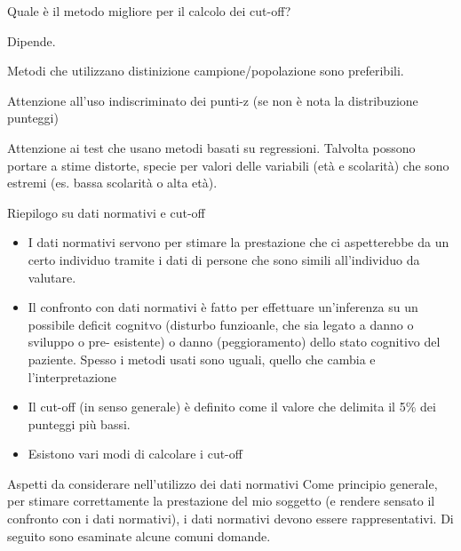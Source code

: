 \documentclass[
  ignorenonframetext,
]{beamer}
\begin{document}
\begin{frame}{Quale è il metodo migliore per il calcolo dei cut-off?}
\label{quale-uxe8-il-metodo-migliore-per-il-calcolo-dei-cut-off}
\pause

Dipende.

\pause

Metodi che utilizzano distinizione campione/popolazione sono
preferibili.

Attenzione all'uso indiscriminato dei punti-z (se non è nota la
distribuzione punteggi)

Attenzione ai test che usano metodi basati su regressioni. Talvolta
possono portare a stime distorte, specie per valori delle variabili (età
e scolarità) che sono estremi (es. bassa scolarità o alta età).
\end{frame}

\begin{frame}{Riepilogo su dati normativi e cut-off}
\label{riepilogo-su-dati-normativi-e-cut-off}
\small

\begin{itemize}
\item
  I dati normativi servono per stimare la prestazione che ci
  aspetterebbe da un certo individuo tramite i dati di persone che sono
  simili all'individuo da valutare.
\item
  Il confronto con dati normativi è fatto per effettuare un'inferenza su
  un possibile deficit cognitvo (disturbo funzioanle, che sia legato a
  danno o sviluppo o pre- esistente) o danno (peggioramento) dello stato
  cognitivo del paziente. Spesso i metodi usati sono uguali, quello che
  cambia e l'interpretazione
\item
  Il cut-off (in senso generale) è definito come il valore che delimita
  il 5\% dei punteggi più bassi.
\item
  Esistono vari modi di calcolare i cut-off
\end{itemize}
\end{frame}

\begin{frame}{Aspetti da considerare nell'utilizzo dei dati normativi}
\label{aspetti-da-considerare-nellutilizzo-dei-dati-normativi}
Come principio generale, per stimare correttamente la prestazione del
mio soggetto (e rendere sensato il confronto con i dati normativi), i
dati normativi devono essere rappresentativi. Di seguito sono esaminate
alcune comuni domande.
\end{frame}
\end{document}
